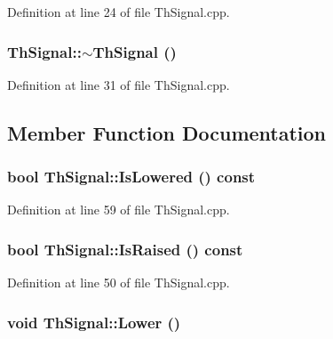 Definition at line 24 of file ThSignal.cpp.\hypertarget{class_th_signal_8e7c1cc0ed668083c257196738f4bc99}{
\subsubsection[{$\sim$ThSignal}]{\setlength{\rightskip}{0pt plus 5cm}ThSignal::$\sim$ThSignal ()}}
\label{class_th_signal_8e7c1cc0ed668083c257196738f4bc99}




Definition at line 31 of file ThSignal.cpp.

\subsection{Member Function Documentation}
\hypertarget{class_th_signal_5b57838592cf1dcca20f62e901722118}{
\subsubsection[{IsLowered}]{\setlength{\rightskip}{0pt plus 5cm}bool ThSignal::IsLowered () const}}
\label{class_th_signal_5b57838592cf1dcca20f62e901722118}




Definition at line 59 of file ThSignal.cpp.\hypertarget{class_th_signal_82ec65969dc097efc86828eb679fc8cc}{
\subsubsection[{IsRaised}]{\setlength{\rightskip}{0pt plus 5cm}bool ThSignal::IsRaised () const}}
\label{class_th_signal_82ec65969dc097efc86828eb679fc8cc}




Definition at line 50 of file ThSignal.cpp.\hypertarget{class_th_signal_a68ff9fdb643e52e789618d9416515ba}{
\subsubsection[{Lower}]{\setlength{\rightskip}{0pt plus 5cm}void ThSignal::Lower ()}}
\label{class_th_signal_a68ff9fdb643e52e789618d9416515ba}




